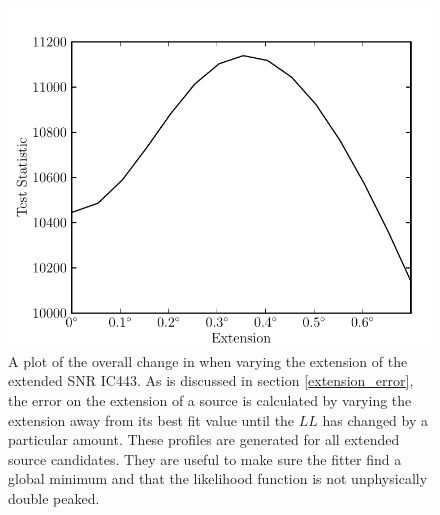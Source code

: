 \documentclass[12pt,preprint]{aastex}
\newcommand{\loglikelihood}{\ensuremath{LL}\xspace}
\newcommand{\ts}{\text{TS}\xspace}
\begin{document}
\clearpage
\begin{figure}
  \begin{center}
    \includegraphics{ic443_plots/profile_ic443.pdf}
    \caption{
    A plot of the overall change in \ts when varying the
    extension of the extended SNR IC443.  As is discussed in section
    \ref{extension_error}, the error on the extension of a source is
    calculated by varying the extension away from its best fit value until
    the \loglikelihood has changed by a particular amount.  These profiles are
    generated for all extended source candidates. They are useful
    to make sure the fitter find a global minimum and that
    the likelihood function is not unphysically double peaked.
    }
    \label{extension_profile}
  \end{center}
\end{figure}
\end{document}
